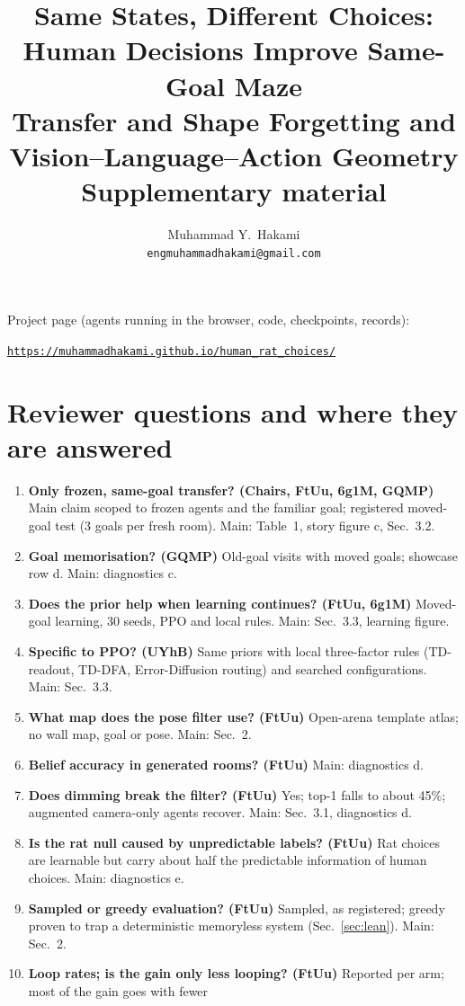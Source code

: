 \documentclass[10pt,onecolumn,letterpaper]{article}
\title{Same States, Different Choices: Human Decisions Improve Same-Goal Maze\\Transfer and Shape Forgetting and Vision--Language--Action Geometry\\Supplementary material}
\author{Muhammad Y.\ Hakami\\{\tt\small engmuhammadhakami@gmail.com}}
\begin{document}
\maketitle
\noindent Project page (agents running in the browser, code, checkpoints, records):\par\nopagebreak
\centerline{\href{https://muhammadhakami.github.io/human_rat_choices/}{\nolinkurl{https://muhammadhakami.github.io/human_rat_choices/}}}


\section{Reviewer questions and where they are answered}
\label{sec:qa}
\begin{small}
\begin{enumerate}\setlength\itemsep{1pt}
\item \textbf{Only frozen, same-goal transfer? (Chairs, FtUu, 6g1M, GQMP)} Main claim scoped to frozen agents and the
familiar goal; registered moved-goal test (3 goals per fresh room). Main: Table~1, story figure c, Sec.~3.2.
\item \textbf{Goal memorisation? (GQMP)} Old-goal visits with moved goals; showcase row d. Main: diagnostics c.
\item \textbf{Does the prior help when learning continues? (FtUu, 6g1M)} Moved-goal learning, 30 seeds, PPO and local
rules. Main: Sec.~3.3, learning figure.
\item \textbf{Specific to PPO? (UYhB)} Same priors with local three-factor rules (TD-readout, TD-DFA, Error-Diffusion
routing) and searched configurations. Main: Sec.~3.3.
\item \textbf{What map does the pose filter use? (FtUu)} Open-arena template atlas; no wall map, goal or pose. Main: Sec.~2.
\item \textbf{Belief accuracy in generated rooms? (FtUu)} Main: diagnostics d.
\item \textbf{Does dimming break the filter? (FtUu)} Yes; top-1 falls to about 45\%; augmented camera-only agents
recover. Main: Sec.~3.1, diagnostics d.
\item \textbf{Is the rat null caused by unpredictable labels? (FtUu)} Rat choices are learnable but carry about half
the predictable information of human choices. Main: diagnostics e.
\item \textbf{Sampled or greedy evaluation? (FtUu)} Sampled, as registered; greedy proven to trap a deterministic
memoryless system (Sec.~\ref{sec:lean}). Main: Sec.~2.
\item \textbf{Loop rates; is the gain only less looping? (FtUu)} Reported per arm; most of the gain goes with fewer

\end{enumerate}
\end{small}
\end{document}
